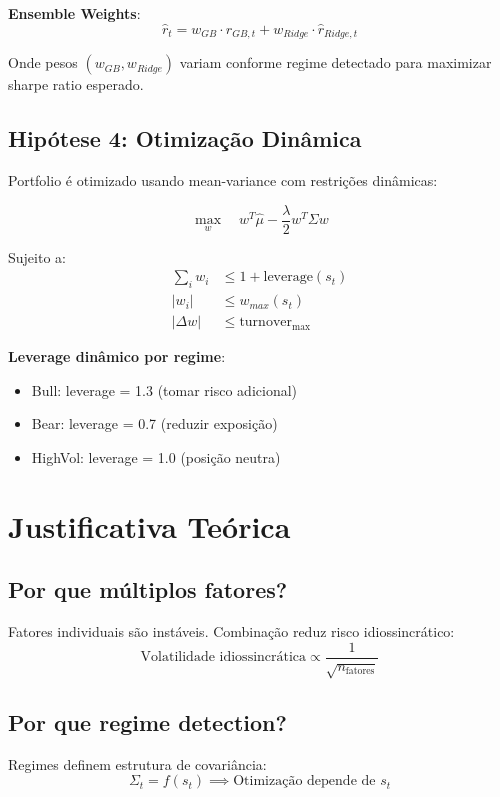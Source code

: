 \documentclass[12pt,a4paper]{article}
\begin{document}
\textbf{Ensemble Weights}:
\[
\hat{r}_t = w_{GB} \cdot \hat{r}_{GB,t} + w_{Ridge} \cdot \hat{r}_{Ridge,t}
\]

Onde pesos $(w_{GB}, w_{Ridge})$ variam conforme regime detectado para maximizar sharpe ratio esperado.

\subsection{Hipótese 4: Otimização Dinâmica}

Portfolio é otimizado usando mean-variance com restrições dinâmicas:

\[
\max_w \quad w^T \hat{\mu} - \frac{\lambda}{2} w^T \Sigma w
\]

Sujeito a:
\begin{align}
\sum_i w_i &\leq 1 + \text{leverage}(s_t) \\
|w_i| &\leq w_{max}(s_t) \\
|\Delta w| &\leq \text{turnover}_{\max}
\end{align}

\textbf{Leverage dinâmico por regime}:
\begin{itemize}
    \item Bull: leverage = 1.3 (tomar risco adicional)
    \item Bear: leverage = 0.7 (reduzir exposição)
    \item HighVol: leverage = 1.0 (posição neutra)
\end{itemize}

\section{Justificativa Teórica}

\subsection{Por que múltiplos fatores?}

Fatores individuais são instáveis. Combinação reduz risco idiossincrático:
\[
\text{Volatilidade idiossincrática} \propto \frac{1}{\sqrt{n_{\text{fatores}}}}
\]

\subsection{Por que regime detection?}

Regimes definem estrutura de covariância:
\[
\Sigma_t = f(s_t) \implies \text{Otimização depende de } s_t
\]
\end{document}
